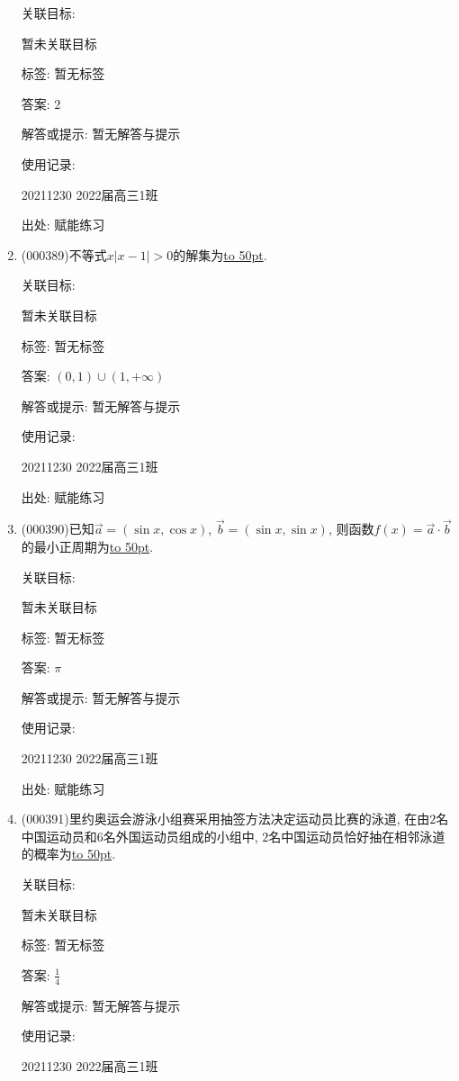 \documentclass[10pt,a4paper]{article}
\newcommand{\blank}[1]{\underline{\hbox to #1pt{}}}
\begin{document}
\begin{enumerate}[1.]
关联目标:

暂未关联目标



标签: 暂无标签

答案: $2$

解答或提示: 暂无解答与提示

使用记录:

20211230	2022届高三1班	


出处: 赋能练习
\item { (000389)}不等式$x|x-1|>0$的解集为\blank{50}.


关联目标:

暂未关联目标



标签: 暂无标签

答案: $(0,1)\cup (1,+\infty)$

解答或提示: 暂无解答与提示

使用记录:

20211230	2022届高三1班	


出处: 赋能练习
\item { (000390)}已知$\overrightarrow a=(\sin x,\cos x)$, $\overrightarrow b=(\sin x,\sin x)$, 则函数$f(x)=\overrightarrow a\cdot \overrightarrow b$的最小正周期为\blank{50}.


关联目标:

暂未关联目标



标签: 暂无标签

答案: $\pi$

解答或提示: 暂无解答与提示

使用记录:

20211230	2022届高三1班	


出处: 赋能练习
\item { (000391)}里约奥运会游泳小组赛采用抽签方法决定运动员比赛的泳道, 在由$2$名中国运动员和$6$名外国运动员组成的小组中, $2$名中国运动员恰好抽在相邻泳道的概率为\blank{50}.


关联目标:

暂未关联目标



标签: 暂无标签

答案: $\frac 14$

解答或提示: 暂无解答与提示

使用记录:

20211230	2022届高三1班	



\end{enumerate}
\end{document}
